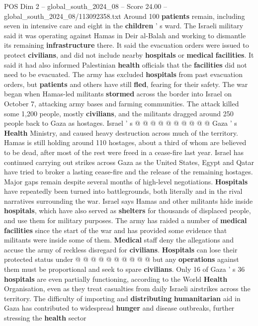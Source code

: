\begin{textsample}{POS Dim 2 – global\_south\_2024\_08 – Score 24.00 – global\_south\_2024\_08/113092358.txt}
Around 100 \textbf{patients} remain, including seven in intensive care and eight in the \textbf{children} ' s ward.
The Israeli military said it was operating against Hamas in Deir al-Balah and working to dismantle its remaining \textbf{infrastructure} there.
It said the evacuation orders were issued to protect \textbf{civilians}, and did not include nearby \textbf{hospitals} or \textbf{medical} \textbf{facilities}.
It said it had also informed Palestinian \textbf{health} officials that the \textbf{facilities} did not need to be evacuated.
The army has excluded \textbf{hospitals} from past evacuation orders, but \textbf{patients} and others have still \textbf{fled}, fearing for their safety.
The war began when Hamas-led militants \textbf{stormed} across the border into Israel on October 7, attacking army bases and farming communities.
The attack killed some 1,200 people, mostly \textbf{civilians}, and the militants dragged around 250 people back to Gaza as hostages.
Israel ' s @ @ @ @ @ @ @ @ @ @ Gaza ' s \textbf{Health} Ministry, and caused heavy destruction across much of the territory.
Hamas is still holding around 110 hostages, about a third of whom are believed to be dead, after most of the rest were freed in a cease-fire last year.
Israel has continued carrying out strikes across Gaza as the United States, Egypt and Qatar have tried to broker a lasting cease-fire and the release of the remaining hostages.
Major gaps remain despite several months of high-level negotiations. \textbf{Hospitals} have repeatedly been turned into battlegrounds, both literally and in the rival narratives surrounding the war.
Israel says Hamas and other militants hide inside \textbf{hospitals}, which have also served as \textbf{shelters} for thousands of displaced people, and use them for military purposes.
The army has raided a number of \textbf{medical} \textbf{facilities} since the start of the war and has provided some evidence that militants were inside some of them. \textbf{Medical} staff deny the allegations and accuse the army of reckless disregard for \textbf{civilians}. \textbf{Hospitals} can lose their protected status under @ @ @ @ @ @ @ @ @ @ but any \textbf{operations} against them must be proportional and seek to spare \textbf{civilians}.
Only 16 of Gaza ' s 36 \textbf{hospitals} are even partially functioning, according to the World \textbf{Health} Organisation, even as they treat casualties from daily Israeli airstrikes across the territory.
The difficulty of importing and \textbf{distributing} \textbf{humanitarian} aid in Gaza has contributed to widespread \textbf{hunger} and disease outbreaks, further stressing the \textbf{health} sector

\end{textsample}
